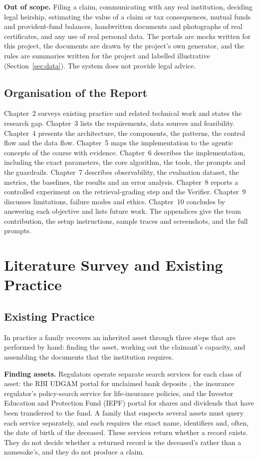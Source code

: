 \documentclass[12pt,a4paper,oneside]{report}
\begin{document}
\textbf{Out of scope.} Filing a claim, communicating with any real institution, deciding legal heirship, estimating the value of a claim or tax consequences, mutual funds and provident-fund balances, handwritten documents and photographs of real certificates, and any use of real personal data. The portals are mocks written for this project, the documents are drawn by the project's own generator, and the rules are summaries written for the project and labelled illustrative (Section~\ref{sec:data}). The system does not provide legal advice.

\section{Organisation of the Report}
Chapter~2 surveys existing practice and related technical work and states the research gap. Chapter~3 lists the requirements, data sources and feasibility. Chapter~4 presents the architecture, the components, the patterns, the control flow and the data flow. Chapter~5 maps the implementation to the agentic concepts of the course with evidence. Chapter~6 describes the implementation, including the exact parameters, the core algorithm, the tools, the prompts and the guardrails. Chapter~7 describes observability, the evaluation dataset, the metrics, the baselines, the results and an error analysis. Chapter~8 reports a controlled experiment on the retrieval-grading step and the Verifier. Chapter~9 discusses limitations, failure modes and ethics. Chapter~10 concludes by answering each objective and lists future work. The appendices give the team contribution, the setup instructions, sample traces and screenshots, and the full prompts.

\chapter{Literature Survey and Existing Practice}
\section{Existing Practice}
In practice a family recovers an inherited asset through three steps that are performed by hand: finding the asset, working out the claimant's capacity, and assembling the documents that the institution requires.

\textbf{Finding assets.} Regulators operate separate search services for each class of asset: the RBI UDGAM portal for unclaimed bank deposits \cite{rbi_udgam}, the insurance regulator's policy-search service for life-insurance policies, and the Investor Education and Protection Fund (IEPF) portal for shares and dividends that have been transferred to the fund. A family that suspects several assets must query each service separately, and each requires the exact name, identifiers and, often, the date of birth of the deceased. These services return whether a record exists. They do not decide whether a returned record is the deceased's rather than a namesake's, and they do not produce a claim.
\end{document}
